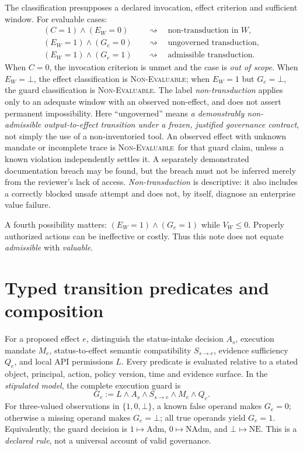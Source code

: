 \documentclass[11pt,a4paper]{article}
\newcommand{\NE}{\textsc{Non-Evaluable}}
\begin{document}
The classification presupposes a declared invocation, effect criterion and sufficient window. For evaluable cases:
\begin{equation}
\begin{aligned}
(C=1)\land(E_W=0)&\quad\rightsquigarrow\quad \text{non-transduction in }W,\\
(E_W=1)\land(G_e=0)&\quad\rightsquigarrow\quad \text{ungoverned transduction},\\
(E_W=1)\land(G_e=1)&\quad\rightsquigarrow\quad \text{admissible transduction}.
\end{aligned}
\label{eq:classes}
\end{equation}
When $C=0$, the invocation criterion is unmet and the case is \emph{out of scope}. When $E_W=\bot$, the effect classification is \NE{}; when $E_W=1$ but $G_e=\bot$, the guard classification is \NE{}. The label \emph{non-transduction} applies only to an adequate window with an observed non-effect, and does not assert permanent impossibility.
Here ``ungoverned'' means \emph{a demonstrably non-admissible output-to-effect transition under a frozen, justified governance contract}, not simply the use of a non-inventoried tool. An observed effect with unknown mandate or incomplete trace is \NE\ for that guard claim, unless a known violation independently settles it. A separately demonstrated documentation breach may be found, but the breach must not be inferred merely from the reviewer's lack of access. \emph{Non-transduction} is descriptive: it also includes a correctly blocked unsafe attempt and does not, by itself, diagnose an enterprise value failure.

A fourth possibility matters: $(E_W=1)\land(G_e=1)$ while $V_W\leq 0$. Properly authorized actions can be ineffective or costly. Thus this note does not equate \emph{admissible} with \emph{valuable}.

\section{Typed transition predicates and composition}
For a proposed effect $e$, distinguish the status-intake decision $A_s$, execution mandate $M_e$, status-to-effect semantic compatibility $S_{s\to e}$, evidence sufficiency $Q_e$, and local API permissions $L$. Every predicate is evaluated relative to a stated object, principal, action, policy version, time and evidence surface. In the \emph{stipulated model}, the complete execution guard is
\begin{equation}
G_e := L\land A_s\land S_{s\to e}\land M_e\land Q_e.
\label{eq:guard}
\end{equation}
For three-valued observations in $\{1,0,\bot\}$, a known false operand makes $G_e=0$; otherwise a missing operand makes $G_e=\bot$; all true operands yield $G_e=1$. Equivalently, the guard decision is $1\mapsto\mathrm{Adm}$, $0\mapsto\mathrm{NAdm}$, and $\bot\mapsto\mathrm{NE}$. This is a \emph{declared rule}, not a universal account of valid governance.
\end{document}
